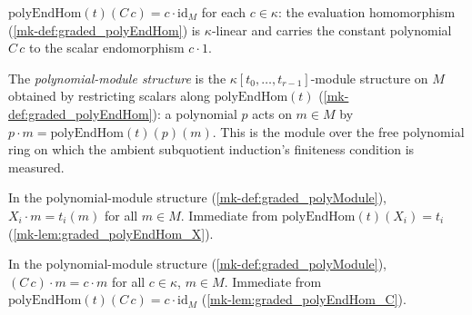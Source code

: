 \begin{lemma}\label{mk-lem:graded_polyEndHom_C}
  \leanok

  \(\mathrm{polyEndHom}(t)(C\,c) = c \cdot \mathrm{id}_M\) for each \(c \in \kappa\):
  the evaluation homomorphism (\ref{mk-def:graded_polyEndHom}) is \(\kappa\)-linear and
  carries the constant polynomial \(C\,c\) to the scalar endomorphism \(c \cdot 1\).
\end{lemma}

\begin{definition}\label{mk-def:graded_polyModule}
  \leanok

  The \emph{polynomial-module structure} is the \(\kappa[t_0, \dots, t_{r-1}]\)-module
  structure on \(M\) obtained by restricting scalars along
  \(\mathrm{polyEndHom}(t)\) (\ref{mk-def:graded_polyEndHom}): a polynomial \(p\) acts on
  \(m \in M\) by \(p \cdot m = \mathrm{polyEndHom}(t)(p)(m)\). This is the module over the
  free polynomial ring on which the ambient subquotient induction's finiteness condition
  is measured.
\end{definition}

\begin{lemma}[$X_i$ acts as $t_i$]\label{mk-lem:graded_polyModule_X_smul}
  \leanok

  In the polynomial-module structure (\ref{mk-def:graded_polyModule}), \(X_i \cdot m =
  t_i(m)\) for all \(m \in M\). Immediate from
  \(\mathrm{polyEndHom}(t)(X_i) = t_i\) (\ref{mk-lem:graded_polyEndHom_X}).
\end{lemma}

\begin{lemma}\label{mk-lem:graded_polyModule_C_smul}
  \leanok

  In the polynomial-module structure (\ref{mk-def:graded_polyModule}), \((C\,c) \cdot m =
  c \cdot m\) for all \(c \in \kappa\), \(m \in M\). Immediate from
  \(\mathrm{polyEndHom}(t)(C\,c) = c \cdot \mathrm{id}_M\)
  (\ref{mk-lem:graded_polyEndHom_C}).
\end{lemma}


